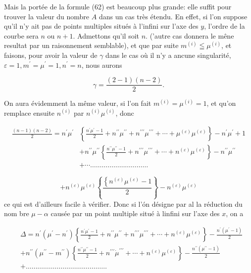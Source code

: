 \documentclass{article}
\begin{document}
Mais la portée de la formule (62) est beaucoup plus grande: elle suffit pour trouver la valeur du nombre \(A\) dans un cas très étendu. En effet, si l'on suppose qu'il n'y ait pas de points multiples situés à l'infini sur l'axe des \(y\), l'ordre de la courbe sera \(n\) ou \(n+1\). Admettons qu'il soit \(n\). ('autre cas donnera le mêne resultat par un raisonnement semblable), et que par suite \(m^{(i)} \leqq \mu^{(i)}\), et faisons, pour avoir la valeur de \(\gamma\) dans le cas où il n'y a ancune singularité, \(\varepsilon=1, m^{\prime}=\mu^{\prime}=1, n^{\prime}=n\), nous aurons

\[
\gamma=\frac{(2-1)(n-2)}{2} .
\]

On aura évidemment la même valeur, si l'on fait \(m^{(i)}=\mu^{(i)}=1\), et qu'on remplace ensuite \(n^{(i)}\) par \(n^{(i)} \mu^{(i)}\), donc

\[
\begin{aligned}
\frac{(n-1)(n-2)}{2}=n^{\prime} \mu^{\prime} & \left\{\frac{n^{\prime} \mu^{\prime}-1}{2}+n^{\prime \prime} \mu^{\prime \prime}+n^{\prime \prime \prime} \mu^{\prime \prime \prime}+\cdots+\mu^{(\varepsilon)} \mu^{(\varepsilon)}\right\}-n^{\prime} \mu^{\prime}+1 \\
& +n^{\prime \prime} \mu^{\prime \prime}\left\{\frac{n^{\prime \prime} \mu^{\prime \prime}-1}{2}+n^{\prime \prime \prime} \mu^{\prime \prime \prime}+\cdots+n^{(\varepsilon)} \mu^{(\varepsilon)}\right\}-n^{\prime \prime} \mu^{\prime \prime} \\
& +\cdots \ldots \ldots \ldots \ldots \ldots \ldots \ldots \ldots \ldots \ldots
\end{aligned}
\]

\[
+n^{(\varepsilon)} \mu^{(\varepsilon)}\left\{\frac{\left\{n^{(\varepsilon)} \mu^{(\varepsilon)}-1\right.}{2}\right\}-n^{(\varepsilon)} \mu^{(\varepsilon)}
\]
ce qui est d'ailleurs facile à vérifier. Donc si l'ón désigne par al la réduction du nom bre \(\mu-\alpha\) causée par un point multiple situé à linfini sur l'axe des \(x\), on a

\[
\begin{aligned}
& \Delta=n^{\prime}\left(\mu^{\prime}-n^{\prime}\right)\left\{\frac{n^{\prime} \mu^{\prime}-1}{2}+n^{\prime \prime} \mu^{\prime \prime}+n^{\prime \prime \prime} \mu^{\prime \prime \prime}+\cdots+n^{(\varepsilon)} \mu^{(\varepsilon)}\right\}-\frac{n^{\prime}\left(\mu^{\prime}-1\right)}{2} \\
& +n^{\prime \prime}\left(\mu^{\prime \prime}-m^{\prime \prime}\right)\left\{\frac{n^{\prime \prime} \mu^{\prime \prime}-1}{2}+n^{\prime \prime \prime} \dot{\mu}^{\prime \prime \prime}+\cdots+n^{(\varepsilon)} \mu^{(\varepsilon)}\right\}-\frac{n^{\prime \prime}\left(\mu^{\prime \prime}-1\right)}{2} \\
& +\ldots \ldots \ldots \ldots \ldots \ldots \ldots \ldots \ldots \ldots \ldots \ldots \ldots \ldots
\end{aligned}
\]
\end{document}
